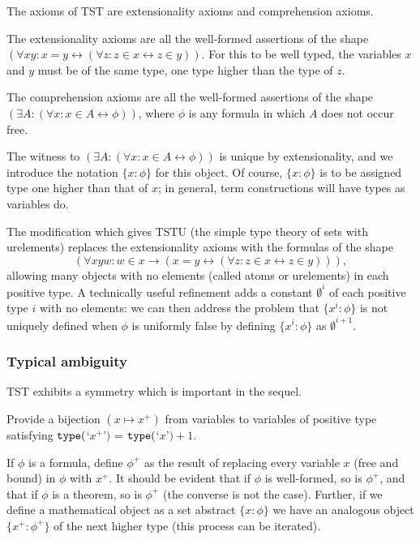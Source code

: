 \documentclass[12pt]{article}
\begin{document}
The axioms of TST are extensionality axioms and comprehension axioms.

The extensionality axioms are all the well-formed assertions of the shape $(\forall xy:x=y \leftrightarrow (\forall z:z \in x \leftrightarrow z\in y))$.  For this to be well typed, the variables
$x$ and $y$ must be of the same type, one type higher than the type of $z$.

The comprehension axioms are all the well-formed assertions of the shape $(\exists A:(\forall x:x \in A \leftrightarrow \phi))$, where $\phi$ is any formula in which $A$ does not occur free.

The witness to $(\exists A:(\forall x:x \in A \leftrightarrow \phi))$ is unique by extensionality, and we introduce the notation $\{x:\phi\}$ for this object.  Of course, $\{x:\phi\}$  is to be assigned type one higher than that of $x$;  in general, term constructions will have types as variables do.

The modification which gives TSTU (the simple type theory of sets with urelements) replaces the extensionality axioms with the formulas of the shape $$(\forall xyw:w \in x \rightarrow (x=y \leftrightarrow (\forall z:z \in x \leftrightarrow z\in y))),$$  allowing many objects with no elements (called atoms or urelements)  in each positive type.  A technically useful refinement adds a constant $\emptyset^i$ of each positive type $i$ with no elements:  we can then address the problem that $\{x^i:\phi\}$ is not uniquely defined when $\phi$ is uniformly false by defining $\{x^i:\phi\}$ as $\emptyset^{i+1}$.

\subsubsection{Typical ambiguity}

TST exhibits a symmetry which is important in the sequel.

Provide a bijection $(x \mapsto x^+)$ from variables to variables of positive type satisfying   ${\tt type}($`$x^+$'$)$ = ${\tt type}($`$x$'$)+1$.

If $\phi$ is a formula, define $\phi^+$ as the result of replacing every variable $x$ (free and bound) in $\phi$ with $x^+$.  It should be evident that if $\phi$ is well-formed, so is $\phi^+$,
and that if $\phi$ is a theorem, so is $\phi^+$ (the converse is not the case).  Further, if we define a mathematical object as a set abstract $\{x:\phi\}$ we have an analogous
object $\{x^+:\phi^+\}$ of the next higher type (this process can be iterated).
\end{document}
